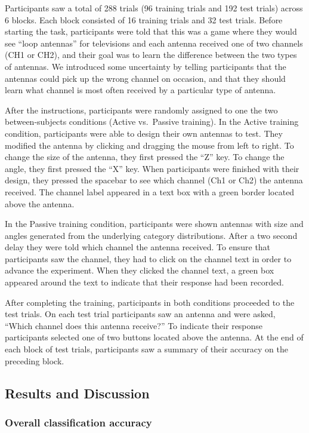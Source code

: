 \documentclass[10pt, letterpaper]{article}
\begin{document}
Participants saw a total of 288 trials (96 training trials and 192 test
trials) across 6 blocks. Each block consisted of 16 training trials and
32 test trials. Before starting the task, participants were told that
this was a game where they would see ``loop antennas'' for televisions
and each antenna received one of two channels (CH1 or CH2), and their
goal was to learn the difference between the two types of antennas. We
introduced some uncertainty by telling participants that the antennas
could pick up the wrong channel on occasion, and that they should learn
what channel is most often received by a particular type of antenna.

After the instructions, participants were randomly assigned to one the
two between-subjects conditions (Active vs.~Passive training). In the
Active training condition, participants were able to design their own
antennas to test. They modified the antenna by clicking and dragging the
mouse from left to right. To change the size of the antenna, they first
pressed the ``Z'' key. To change the angle, they first pressed the ``X''
key. When participants were finished with their design, they pressed the
spacebar to see which channel (Ch1 or Ch2) the antenna received. The
channel label appeared in a text box with a green border located above
the antenna.

In the Passive training condition, participants were shown antennas with
size and angles generated from the underlying category distributions.
After a two second delay they were told which channel the antenna
received. To ensure that participants saw the channel, they had to click
on the channel text in order to advance the experiment. When they
clicked the channel text, a green box appeared around the text to
indicate that their response had been recorded.

After completing the training, participants in both conditions proceeded
to the test trials. On each test trial participants saw an antenna and
were asked, ``Which channel does this antenna receive?'' To indicate
their response participants selected one of two buttons located above
the antenna. At the end of each block of test trials, participants saw a
summary of their accuracy on the preceding block.

\subsection{Results and Discussion}\label{results-and-discussion}

\subsubsection{Overall classification
accuracy}\label{overall-classification-accuracy}
\end{document}
